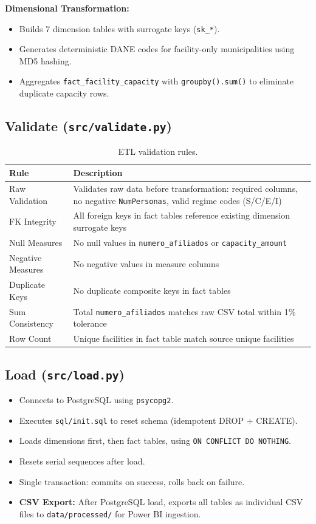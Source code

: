 \documentclass[12pt,a4paper]{article}
\begin{document}
\textbf{Dimensional Transformation:}
\begin{itemize}[nosep]
    \item Builds 7 dimension tables with surrogate keys (\texttt{sk\_*}).
    \item Generates deterministic DANE codes for facility-only municipalities using MD5 hashing.
    \item Aggregates \texttt{fact\_facility\_capacity} with \texttt{groupby().sum()} to eliminate duplicate capacity rows.
\end{itemize}

\subsection{Validate (\texttt{src/validate.py})}

\begin{table}[H]
\centering
\small
\begin{tabularx}{\textwidth}{p{3.5cm} X}
\toprule
\textbf{Rule} & \textbf{Description}\\
\midrule
Raw Validation & Validates raw data before transformation: required columns, no negative \texttt{NumPersonas}, valid regime codes (S/C/E/I)\\
FK Integrity & All foreign keys in fact tables reference existing dimension surrogate keys\\
Null Measures & No null values in \texttt{numero\_afiliados} or \texttt{capacity\_amount}\\
Negative Measures & No negative values in measure columns\\
Duplicate Keys & No duplicate composite keys in fact tables\\
Sum Consistency & Total \texttt{numero\_afiliados} matches raw CSV total within 1\% tolerance\\
Row Count & Unique facilities in fact table match source unique facilities\\
\bottomrule
\end{tabularx}
\caption{ETL validation rules.}
\end{table}

\subsection{Load (\texttt{src/load.py})}

\begin{itemize}[nosep]
    \item Connects to PostgreSQL using \texttt{psycopg2}.
    \item Executes \texttt{sql/init.sql} to reset schema (idempotent DROP + CREATE).
    \item Loads dimensions first, then fact tables, using \texttt{ON CONFLICT DO NOTHING}.
    \item Resets serial sequences after load.
    \item Single transaction: commits on success, rolls back on failure.
    \item \textbf{CSV Export:} After PostgreSQL load, exports all tables as individual CSV files to \texttt{data/processed/} for Power BI ingestion.
\end{itemize}
\end{document}

